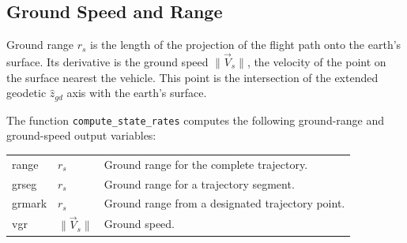 \subsection{Ground Speed and Range}\label{sec:ground-speed}

Ground range $r_s$ is the length of the projection of the flight path onto the
earth's surface. Its derivative is the ground speed $\lVert\vec V_s\rVert$, the
velocity of the point on the surface nearest the vehicle. This point is the
intersection of the extended geodetic $\hat z_{gd}$ axis with the earth's surface.

The function \texttt{compute\_state\_rates} computes the following ground-range
and ground-speed output variables:
\begin{longtable}{@{}>{\ttfamily}p{}p{}p{}@{}}
  range  & $r_s$ & Ground range for the complete trajectory.\\
  grseg  & $r_s$ & Ground range for a trajectory segment.\\
  grmark & $r_s$ & Ground range from a designated trajectory point.\\
  vgr    & $\lVert\vec V_s\rVert$ & Ground speed.\\
\end{longtable}

